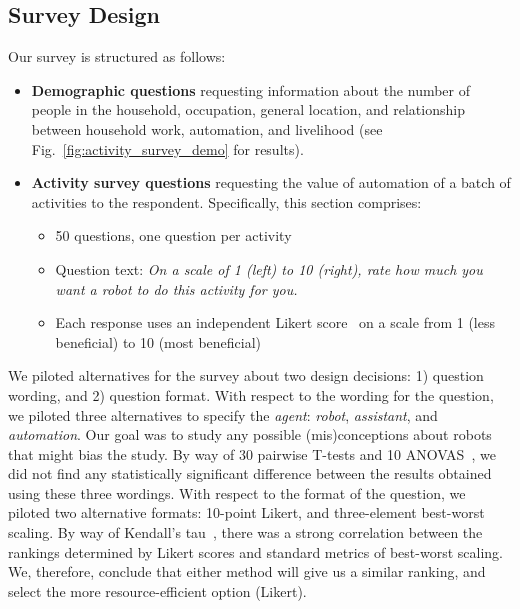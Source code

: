 \subsection{Survey Design} 
Our survey is structured as follows:
\vspace{-2mm}
\begin{itemize}[leftmargin=1.5em]
    \item \textbf{Demographic questions} requesting information about the number of people in the household, occupation, general location, and relationship between household work, automation, and livelihood (see Fig.~\ref{fig:activity_survey_demo} for results). 
    \item \textbf{Activity survey questions} requesting the value of automation of a batch of activities to the respondent. Specifically, this section comprises:
    \begin{itemize}
        \item 50 questions, one question per activity 
        \item Question text: \textit{On a scale of 1 (left) to 10 (right), rate how much you want a robot to do this activity for you.}
        \item Each response uses an independent Likert score~\cite{likert1932technique} on a scale from 1 (less beneficial) to 10 (most beneficial)
    \end{itemize}
\end{itemize}

We piloted alternatives for the survey about two design decisions: 1) question wording, and 2) question format. With respect to the wording for the question, we piloted three alternatives to specify the \textit{agent}: \textit{robot}, \textit{assistant}, and \textit{automation}. Our goal was to study any possible (mis)conceptions about robots that might bias the study. By way of 30 pairwise T-tests and 10 ANOVAS~\cite{stats2013montgomery}, we did not find any statistically significant difference between the results obtained using these three wordings. With respect to the format of the question, we piloted two alternative formats: 10-point Likert, and three-element best-worst scaling. By way of Kendall's tau~\cite{stats2013montgomery}, there was a strong correlation between the rankings determined by Likert scores and standard metrics of best-worst scaling. We, therefore, conclude that either method will give us a similar ranking, and select the more resource-efficient option (Likert). 

